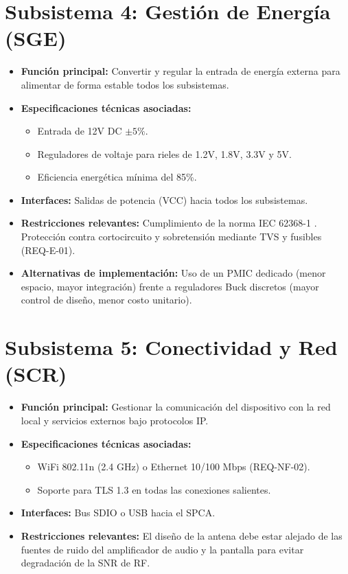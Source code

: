 \documentclass[%
	paper=a4,
	twoside=false,
	parskip=half,
	chapterprefix=false,
	10pt,
	headings=normal,
	bibliography=totoc,
	listof=totoc,
	titlepage=on,
	captions=tableabove,
	draft=false, 
]{scrbook}%
\begin{document}
\section{Subsistema 4: Gestión de Energía (SGE)}
\begin{itemize}
    \item \textbf{Función principal:} Convertir y regular la entrada de energía externa para alimentar de forma estable todos los subsistemas.
    \item \textbf{Especificaciones técnicas asociadas:}
        \begin{itemize}
            \item Entrada de 12V DC $\pm 5\%$.
            \item Reguladores de voltaje para rieles de 1.2V, 1.8V, 3.3V y 5V.
            \item Eficiencia energética mínima del 85\%.
        \end{itemize}
    \item \textbf{Interfaces:} Salidas de potencia (VCC) hacia todos los subsistemas.
    \item \textbf{Restricciones relevantes:} Cumplimiento de la norma IEC 62368-1 \cite{iec62368}. Protección contra cortocircuito y sobretensión mediante TVS y fusibles (REQ-E-01).
    \item \textbf{Alternativas de implementación:} Uso de un PMIC dedicado (menor espacio, mayor integración) frente a reguladores Buck discretos (mayor control de diseño, menor costo unitario).
\end{itemize}

\section{Subsistema 5: Conectividad y Red (SCR)}
\begin{itemize}
    \item \textbf{Función principal:} Gestionar la comunicación del dispositivo con la red local y servicios externos bajo protocolos IP.
    \item \textbf{Especificaciones técnicas asociadas:}
        \begin{itemize}
            \item WiFi 802.11n (2.4 GHz) o Ethernet 10/100 Mbps (REQ-NF-02).
            \item Soporte para TLS 1.3 en todas las conexiones salientes.
        \end{itemize}
    \item \textbf{Interfaces:} Bus SDIO o USB hacia el SPCA.
    \item \textbf{Restricciones relevantes:} El diseño de la antena debe estar alejado de las fuentes de ruido del amplificador de audio y la pantalla para evitar degradación de la SNR de RF.
\end{itemize}
\end{document}
